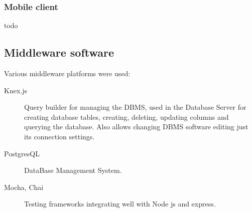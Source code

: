 \documentclass[../main.tex]{subfiles}
\begin{document}
\subsubsection{Mobile client}

todo



\subsection{Middleware software}

Various middleware platforms were used:

{\begin{description}
	\item [Knex.js] Query builder for managing the DBMS, used in the Database Server for creating database tables, creating, deleting, updating columns and querying the database. Also allows changing DBMS software editing just its connection settings.
	\item [PostgresQL] DataBase Management System.
	\item [Mocha, Chai] Testing frameworks integrating well with Node js and express.
\end{description}}
\end{document}
